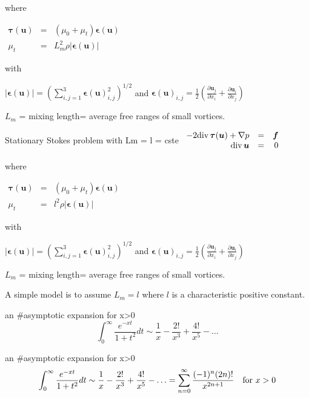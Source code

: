 where

$
\begin{array}{ccc}
{\boldsymbol \tau}({\boldsymbol u})&=&(\mu_0+\mu_t){\boldsymbol \epsilon}({\boldsymbol u}) \\
\mu_t&=&L^2_m \rho|{\boldsymbol \epsilon}({\boldsymbol u})|
\end{array}
$

with

$|{\boldsymbol \epsilon}({\boldsymbol u})|=\displaystyle\left(\sum^3_{i,j=1}{\boldsymbol \epsilon}({\boldsymbol u})^2_{i,j}\right)^{1/2}$ and $\displaystyle{\boldsymbol \epsilon}({\boldsymbol u})_{i,j}=\frac{1}{2}\left(\frac{\partial {\boldsymbol u}_j}{\partial x_i}+\frac{\partial {\boldsymbol u}_i}{\partial x_j}\right)$

$L_m$ = mixing length= average free ranges of small vortices.


Stationary Stokes problem with Lm = l = cste
$
\begin{array}{rrr}
-2{\rm div\,}{\boldsymbol \tau}({\boldsymbol u})+\nabla p&=&{\boldsymbol f} \\
{\rm div\,}{\boldsymbol u}&=&0
\end{array}
$

where

$
\begin{array}{ccc}
{\boldsymbol \tau}({\boldsymbol u})&=&(\mu_0+\mu_t){\boldsymbol \epsilon}({\boldsymbol u}) \\
\mu_t&=&l^2 \rho|{\boldsymbol \epsilon}({\boldsymbol u})|
\end{array}
$

with

$|{\boldsymbol \epsilon}({\boldsymbol u})|=\displaystyle\left(\sum^3_{i,j=1}{\boldsymbol \epsilon}({\boldsymbol u})^2_{i,j}\right)^{1/2}$ and $\displaystyle{\boldsymbol \epsilon}({\boldsymbol u})_{i,j}=\frac{1}{2}\left(\frac{\partial {\boldsymbol u}_j}{\partial x_i}+\frac{\partial {\boldsymbol u}_i}{\partial x_j}\right)$

$L_m$ = mixing length= average free ranges of small vortices.

A simple model is to assume $L_m = l$ where $l$ is a characteristic positive
constant.


an #asymptotic expansion for x>0
$$
\int^\infty_0 \frac{e^{-xt}}{1+t^2}dt \sim \frac{1}{x}-\frac{2!}{x^3}+\frac{4!}{x^5}-\ldots
$$

an #asymptotic expansion for x>0
$$
\int^\infty_0 \frac{e^{-xt}}{1+t^2}dt \sim \frac{1}{x}-\frac{2!}{x^3}+\frac{4!}{x^5}-\ldots=\sum^\infty_{n=0}\frac{(-1)^n (2n)!}{x^{2n+1}} \quad {\rm for}\,\,x>0
$$

